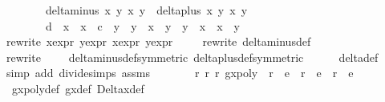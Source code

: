\begin{isabellebody}
\ \ \ \ \ \ \ {\isacharparenleft}delta{\isacharunderscore}minus\ x{}\ y{}\ x{}\ y{}\ {\isacharasterisk}\ delta{\isacharunderscore}plus\ x{}\ y{}\ x{}\ y{}\ {\isacharminus}\ \isanewline
\ \ \ \ \ \ \ d\ {\isacharasterisk}\ {\isacharparenleft}x{}\ {\isacharasterisk}\ x{}\ {\isacharminus}\ c\ {\isacharasterisk}\ y{}\ {\isacharasterisk}\ y{}{\isacharparenright}\ {\isacharasterisk}\ {\isacharparenleft}x{}\ {\isacharasterisk}\ y{}\ {\isacharplus}\ y{}\ {\isacharasterisk}\ x{}{\isacharparenright}\ {\isacharasterisk}\ x{}\ {\isacharasterisk}\ y{}{\isacharparenright}{\isachardoublequoteclose}\isanewline
\ \ \ \ \isamarkupfalse%
{\isacharparenleft}rewrite\ x{}{\isacharprime}{\isacharunderscore}expr\ y{}{\isacharprime}{\isacharunderscore}expr\ x{}{\isacharprime}{\isacharunderscore}expr\ y{}{\isacharprime}{\isacharunderscore}expr{\isacharparenright}{\isacharplus}\isanewline
\ \ \ \ \isamarkupfalse%
{\isacharparenleft}rewrite\ delta{\isacharunderscore}minus{\isacharunderscore}def{\isacharparenright}\isanewline
\ \ \ \ \isamarkupfalse%
{\isacharparenleft}rewrite\ \ {\isachardoublequoteopen}{\isacharunderscore}\ {\isacharslash}\ {\isasymhole}{\isachardoublequoteclose}\ delta{\isacharunderscore}minus{\isacharunderscore}def{\isacharbrackleft}symmetric{\isacharbrackright}\ delta{\isacharunderscore}plus{\isacharunderscore}def{\isacharbrackleft}symmetric{\isacharbrackright}{\isacharparenright}{\isacharplus}\isanewline
\ \ \ \ \isamarkupfalse%
\ delta{\isacharunderscore}def\isanewline
\ \ \ \ \isamarkupfalse%
{\isacharparenleft}simp\ add{\isacharcolon}\ divide{\isacharunderscore}simps\ assms{\isacharparenleft}{}{\isacharminus}{}{\isacharparenright}{\isacharparenright}\isanewline
\ \ \isanewline
\ \ \isamarkupfalse%
\ {\isachardoublequoteopen}{\isasymexists}\ r{}\ r{}\ r{}{\isachardot}\ gxpoly\ {\isacharequal}\ r{}\ {\isacharasterisk}\ e{}\ {\isacharplus}\ r{}\ {\isacharasterisk}\ e{}\ {\isacharplus}\ r{}\ {\isacharasterisk}\ e{}{\isachardoublequoteclose}\isanewline
\ \ \ \ \isamarkupfalse%
\ gxpoly{\isacharunderscore}def\ g\isactrlsub x{\isacharunderscore}def\ Delta\isactrlsub x{\isacharunderscore}def\ \isanewline

\end{isabellebody}
